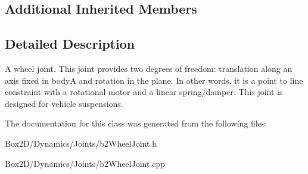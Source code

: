 \subsection*{Additional Inherited Members}


\subsection{Detailed Description}
A wheel joint. This joint provides two degrees of freedom\+: translation along an axis fixed in bodyA and rotation in the plane. In other words, it is a point to line constraint with a rotational motor and a linear spring/damper. This joint is designed for vehicle suspensions. 

The documentation for this class was generated from the following files\+:\begin{DoxyCompactItemize}
\item 
Box2\+D/\+Dynamics/\+Joints/b2\+Wheel\+Joint.\+h\item 
Box2\+D/\+Dynamics/\+Joints/b2\+Wheel\+Joint.\+cpp\end{DoxyCompactItemize}
